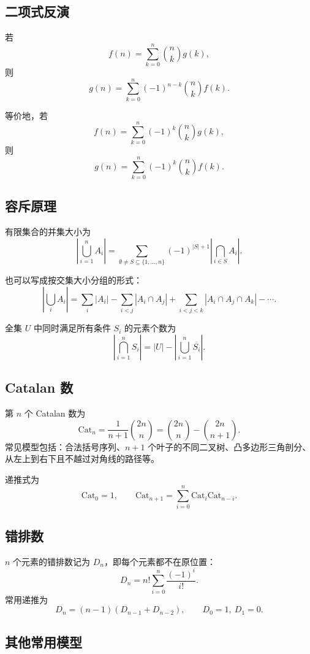 \subsection{二项式反演}

若
\[
    f(n)=\sum_{k=0}^{n}\binom{n}{k}g(k),
\]
则
\[
    g(n)=\sum_{k=0}^{n}(-1)^{n-k}\binom{n}{k}f(k).
\]

等价地，若
\[
    f(n)=\sum_{k=0}^{n}(-1)^k\binom{n}{k}g(k),
\]
则
\[
    g(n)=\sum_{k=0}^{n}(-1)^k\binom{n}{k}f(k).
\]

\subsection{容斥原理}

有限集合的并集大小为
\[
    \left|\bigcup_{i=1}^{n}A_i\right|
    =\sum_{\emptyset\ne S\subseteq\{1,\dots,n\}}
    (-1)^{|S|+1}\left|\bigcap_{i\in S}A_i\right|.
\]

也可以写成按交集大小分组的形式：
\[
    \left|\bigcup_iA_i\right|
    =\sum_i|A_i|-\sum_{i<j}|A_i\cap A_j|
    +\sum_{i<j<k}|A_i\cap A_j\cap A_k|-\cdots.
\]

全集 $U$ 中同时满足所有条件 $S_i$ 的元素个数为
\[
    \left|\bigcap_{i=1}^{n}S_i\right|
    =|U|-\left|\bigcup_{i=1}^{n}\overline{S_i}\right|.
\]

\subsection{Catalan 数}

第 $n$ 个 Catalan 数为
\[
    \mathrm{Cat}_n
    =\frac{1}{n+1}\binom{2n}{n}
    =\binom{2n}{n}-\binom{2n}{n+1}.
\]
常见模型包括：合法括号序列、$n+1$ 个叶子的不同二叉树、凸多边形三角剖分、
从左上到右下且不越过对角线的路径等。

递推式为
\[
    \mathrm{Cat}_0=1,\qquad
    \mathrm{Cat}_{n+1}=\sum_{i=0}^{n}\mathrm{Cat}_i\mathrm{Cat}_{n-i}.
\]

\subsection{错排数}

$n$ 个元素的错排数记为 $D_n$，即每个元素都不在原位置：
\[
    D_n=n!\sum_{i=0}^{n}\frac{(-1)^i}{i!}.
\]
常用递推为
\[
    D_n=(n-1)(D_{n-1}+D_{n-2}),
    \qquad D_0=1,\ D_1=0.
\]

\subsection{其他常用模型}

